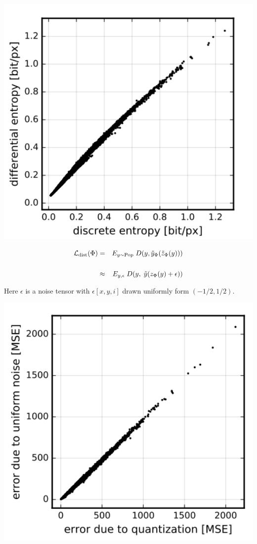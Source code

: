 {\bigskip
\centerline{\includegraphics[height=5in]{../images/RateDist6}}


\begin{eqnarray*}
{\cal L}_{\mathrm{dist}}(\Phi) & = & E_{y \sim \mathrm{Pop}} \;D(y,\tilde{y}_\Phi(\tilde{z}_\Phi(y))) \\
\\
& \approx & E_{y,\epsilon} \;D(y,\;\tilde{y}(z_\Phi(y) + \epsilon))
\end{eqnarray*}

\vfill
Here $\epsilon$ is a noise tensor with $\epsilon[x,y,i]$ drawn uniformly form $(-1/2,1/2)$.


\centerline{\includegraphics[height=5in]{../images/RateDist5}}


}
